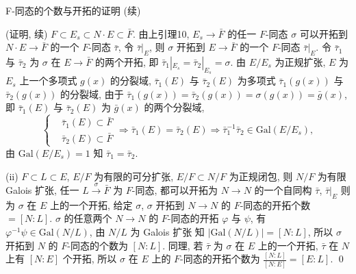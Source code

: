 \begin{frame}{F-同态的个数与开拓的证明 (续)}

\startproof[bg=yellow, fg=red](证明, 续)
$F \subset E_s \subset N \cdot E \subset \bar{F}$.
由上引理10, $E_s \to \bar{F}$ 的任一 $F$-同态 $\sigma$ 可以开拓到
$N \cdot E \to \bar{F}$ 的一个 $F$-同态 $\bar{\tau}$,
令 $\bar{\tau}|_E$, 则 $\sigma$ 开拓到 $E \to \bar{F}$ 的一个 $F$-同态
$\bar{\tau}|_E$. 令 $\bar{\tau}_1$ 与 $\bar{\tau}_2$ 为 $\sigma$ 在 $E \to \bar{F}$
的两个开拓, 即 $\bar{\tau}_1|_{E_s} = \bar{\tau}_2|_{E_s} = \sigma$.
由 $E/E_s$ 为正规扩张, $E$ 为 $E_s$ 上一个多项式 $g(x)$ 的分裂域,
$\bar{\tau}_1(E)$ 与 $\bar{\tau}_2(E)$ 为多项式 $\bar{\tau}_1(g(x))$ 与
$\bar{\tau}_2(g(x))$ 的分裂域,
由于 $\bar{\tau}_1(g(x)) = \bar{\tau}_2(g(x)) = \sigma(g(x)) = \bar{g}(x)$,
即 $\bar{\tau}_1(E)$ 与 $\bar{\tau}_2(E)$ 为 $\bar{g}(x)$ 的两个分裂域,
\[
\left\{
\begin{aligned}
&\bar{\tau}_1(E) \subset \bar{F} \\
&\bar{\tau}_2(E) \subset \bar{F}
\end{aligned}
\right.
\Longrightarrow \bar{\tau}_1(E) = \bar{\tau}_2(E)
\Longrightarrow \bar{\tau}_1^{-1} \bar{\tau}_2 \in \mathrm{Gal}(E/E_s),
\]
由 $\mathrm{Gal}(E/E_s) = 1$ 知 $\bar{\tau}_1 = \bar{\tau}_2$.

\pause

(ii) $F \subset L \subset E$, $E/F$ 为有限的可分扩张, $E/F \subset N/F$
为正规闭包, 则 $N/F$ 为有限 Galois 扩张, 任一 $L \xrightarrow{\ \sigma\ } \bar{F}$
为 $F$-同态, 都可以开拓为 $N \to N$ 的一个自同构 $\bar{\tau}$,
$\bar{\tau}|_E$ 则为 $\sigma$ 在 $E$ 上的一个开拓,
给定 $\sigma$, $\sigma$ 开拓到 $N \to N$ 的 $F$-同态的开拓个数 $= [N:L]$.
$\sigma$ 的任意两个 $N \to N$ 的 $F$-同态的开拓 $\varphi$ 与 $\psi$,
有 $\varphi^{-1} \psi \in \mathrm{Gal}(N/L)$,
由 $N/L$ 为 Galois 扩张 知 $|\mathrm{Gal}(N/L)| = [N:L]$,
所以 $\sigma$ 开拓到 $N$ 的 $F$-同态的个数为 $[N:L]$.
同理, 若 $\bar{\tau}$ 为 $\sigma$ 在 $E$ 上的一个开拓,
$\bar{\tau}$ 在 $N$ 上有 $[N:E]$ 个开拓,
所以 $\sigma$ 在 $E$ 上的 $F$-同态的开拓个数为
$\frac{[N:L]}{[N:E]} = [E:L]$.
\qed

\end{frame}


